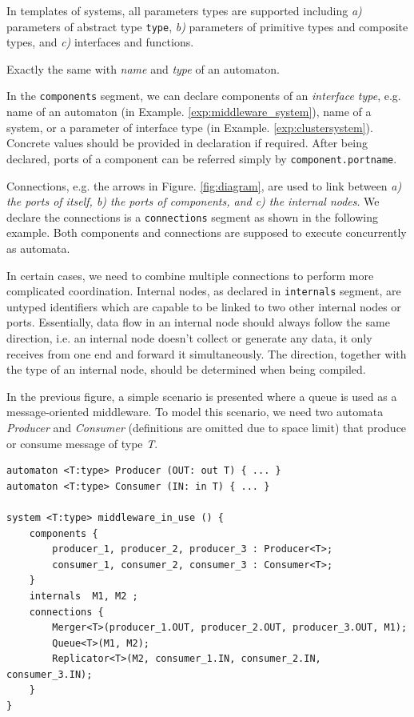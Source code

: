  In templates of systems, all parameters types are supported including \emph{a)} parameters of abstract type \texttt{type}, \emph{b)} parameters of primitive types and composite types, and \emph{c)} interfaces and functions.

 Exactly the same with \emph{name} and \emph{type} of an automaton.

 In the \texttt{components} segment, we can declare components of an \emph{interface type}, e.g. name of an automaton (in Example. \ref{exp:middleware_system}), name of a system, or a parameter of interface type (in Example. \ref{exp:clustersystem}). Concrete values should be provided in declaration if required. 
After being declared, ports of a component can be referred simply by \texttt{component.portname}.

 Connections, e.g. the arrows in Figure. \ref{fig:diagram}, are used to link between \emph{a) the ports of itself, b) the ports of components, and c) the internal nodes}. We declare the connections is a \texttt{connections} segment as shown in the following example.
Both components and connections are supposed to execute concurrently as automata.

 In certain cases, we need to combine multiple connections to perform more complicated coordination. Internal nodes, as declared in \texttt{internals} segment, are untyped identifiers which are capable to be linked to two other internal nodes or ports. Essentially, data flow in an internal node should always follow the same direction, i.e. an internal node doesn't collect or generate any data, it only receives from one end and forward it simultaneously. The direction, together with the type of an internal node, should be determined when being compiled.

\begin{example} In the previous figure, a simple scenario is presented where a queue is used as a message-oriented middleware. To model this scenario, we need two automata \emph{Producer} and \emph{Consumer} (definitions are omitted due to space limit) that produce or consume message of type \emph{T}.
\begin{lstlisting}
automaton <T:type> Producer (OUT: out T) { ... }
automaton <T:type> Consumer (IN: in T) { ... }

system <T:type> middleware_in_use () {
    components {
        producer_1, producer_2, producer_3 : Producer<T>;
        consumer_1, consumer_2, consumer_3 : Consumer<T>;
    }
    internals  M1, M2 ;
    connections {
        Merger<T>(producer_1.OUT, producer_2.OUT, producer_3.OUT, M1);
        Queue<T>(M1, M2);
        Replicator<T>(M2, consumer_1.IN, consumer_2.IN, consumer_3.IN);
    }
}
\end{lstlisting}
\label{exp:middleware_system}
\end{example}

